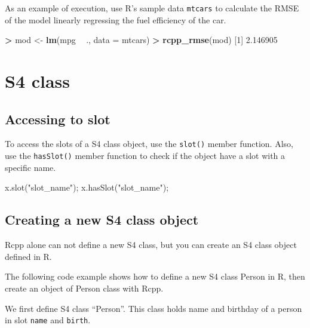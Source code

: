 \documentclass[
]{book}
\newenvironment{Shaded}{\begin{snugshade}}{\end{snugshade}}
\newcommand{\DataTypeTok}[1]{\textcolor[rgb]{0.13,0.29,0.53}{#1}}
\newcommand{\DecValTok}[1]{\textcolor[rgb]{0.00,0.00,0.81}{#1}}
\newcommand{\FloatTok}[1]{\textcolor[rgb]{0.00,0.00,0.81}{#1}}
\newcommand{\KeywordTok}[1]{\textcolor[rgb]{0.13,0.29,0.53}{\textbf{#1}}}
\newcommand{\NormalTok}[1]{#1}
\newcommand{\OperatorTok}[1]{\textcolor[rgb]{0.81,0.36,0.00}{\textbf{#1}}}
\newcommand{\StringTok}[1]{\textcolor[rgb]{0.31,0.60,0.02}{#1}}
\begin{document}
As an example of execution, use R's sample data \texttt{mtcars} to calculate the RMSE of the model linearly regressing the fuel efficiency of the car.

\begin{Shaded}
\begin{Highlighting}[]
\OperatorTok{>}\StringTok{ }\NormalTok{mod <-}\StringTok{ }\KeywordTok{lm}\NormalTok{(mpg }\OperatorTok{~}\StringTok{ }\NormalTok{., }\DataTypeTok{data =}\NormalTok{ mtcars)}
\OperatorTok{>}\StringTok{ }\KeywordTok{rcpp_rmse}\NormalTok{(mod)}
\NormalTok{[}\DecValTok{1}\NormalTok{] }\FloatTok{2.146905}
\end{Highlighting}
\end{Shaded}

\hypertarget{s4-class}{%
\section{S4 class}\label{s4-class}}

\hypertarget{accessing-to-slot}{%
\subsection{Accessing to slot}\label{accessing-to-slot}}

To access the slots of a S4 class object, use the \texttt{slot()} member function. Also, use the \texttt{hasSlot()} member function to check if the object have a slot with a specific name.

\begin{Shaded}
\begin{Highlighting}[]
\NormalTok{x.slot(}\StringTok{"slot_name"}\NormalTok{);}
\NormalTok{x.hasSlot(}\StringTok{"slot_name"}\NormalTok{);}
\end{Highlighting}
\end{Shaded}

\hypertarget{creating-a-new-s4-class-object}{%
\subsection{Creating a new S4 class object}\label{creating-a-new-s4-class-object}}

Rcpp alone can not define a new S4 class, but you can create an S4 class object defined in R.

The following code example shows how to define a new S4 class Person in R, then create an object of Person class with Rcpp.

We first define S4 class ``Person''. This class holds name and birthday of a person in slot \texttt{name} and \texttt{birth}.
\end{document}
